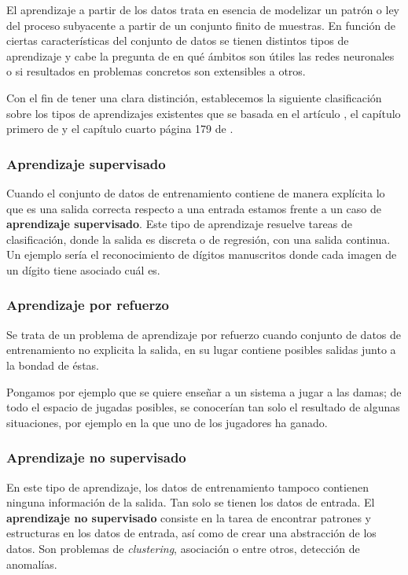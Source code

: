 El aprendizaje a partir de los datos trata en esencia de modelizar un patrón o ley del proceso subyacente a partir de un conjunto finito de muestras.  
En función de ciertas características del conjunto de datos se 
tienen distintos tipos de aprendizaje y cabe la pregunta de en qué ámbitos son útiles las redes neuronales o si resultados en problemas 
 concretos 
son extensibles a otros. 

Con el fin de tener una clara distinción,
establecemos la siguiente clasificación sobre los tipos de aprendizajes existentes 
que se basada en el
artículo \cite{importancia-arte-aprendizaje-automatico},
 el capítulo primero de  \cite{MostafaLearningFromData}
 y el capítulo cuarto   página 179 de
\cite{BishopPaterRecognition}.

\subsubsection{Aprendizaje supervisado}
Cuando el conjunto de datos de entrenamiento contiene de manera explícita lo que es una salida correcta respecto a una entrada estamos frente a un caso de \textbf{aprendizaje supervisado}.   
Este tipo de aprendizaje resuelve tareas de clasificación, donde la salida es discreta 
o de regresión, con una salida continua.
Un ejemplo sería el reconocimiento de dígitos  manuscritos donde cada imagen de un dígito tiene asociado cuál es. 



\subsubsection{Aprendizaje por refuerzo}  
Se trata de un problema de aprendizaje por refuerzo 
cuando conjunto de datos de entrenamiento no explicita la salida, en su lugar contiene posibles salidas junto a la bondad de éstas. 

Pongamos por ejemplo que se quiere enseñar a un sistema a jugar
a las damas; de todo el espacio de jugadas posibles, se conocerían tan solo el resultado de algunas situaciones, por ejemplo en la que uno de los jugadores ha ganado.  


\subsubsection{Aprendizaje no supervisado}  

En este tipo de aprendizaje, los datos de entrenamiento tampoco contienen ninguna información de la salida.
 Tan solo se tienen los datos de entrada. El \textbf{aprendizaje no supervisado} 
 consiste en la tarea de encontrar patrones y estructuras en los datos de entrada, 
 así como de crear una abstracción de los datos.  Son problemas de \textit{clustering}, asociación o entre otros, detección de anomalías.

